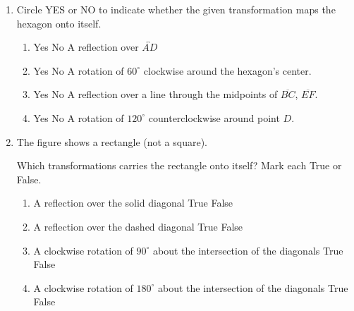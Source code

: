 \documentclass[12pt, twoside]{article}
\begin{document}
\begin{enumerate}
\item Circle YES or NO to indicate whether the given transformation maps the hexagon onto itself.
\vspace{0.5cm}
\begin{multicols}{2}
  \begin{enumerate}
   \item Yes \quad No \quad A reflection over $\overleftrightarrow{AD}$
   \item Yes \quad No \quad A rotation of $60^\circ$ clockwise around the hexagon's center.
   \item Yes \quad No \quad A reflection over a line through the midpoints of  $\overline{BC}$, $\overline{EF}$.
   \item Yes \quad No \quad A rotation of $120^\circ$ counterclockwise around point $D$.
   \end{enumerate}
 \begin{center}
   \end{center}
 \end{multicols} \vspace{0.5cm}

\newpage
\item The figure shows a rectangle (not a square).
 \begin{center}
 \end{center}
 Which transformations carries the rectangle onto itself? Mark each True or False.
   \begin{enumerate}
     \item A reflection over the solid diagonal \hfill True \quad False
     \item A reflection over the dashed diagonal \hfill True \quad False
     \item A clockwise rotation of $90^\circ$ about the intersection of the diagonals \hfill True \quad False
     \item A clockwise rotation of $180^\circ$ about the intersection of the diagonals \hfill True \quad False
   \end{enumerate}


\end{enumerate}
\end{document}
